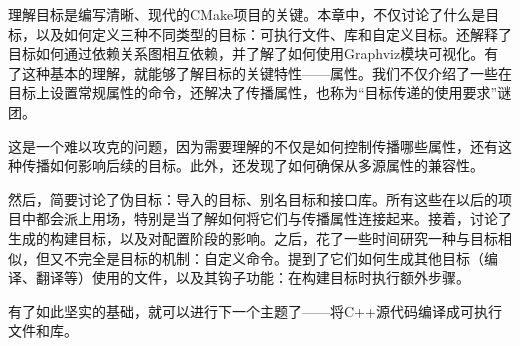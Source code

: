 理解目标是编写清晰、现代的CMake项目的关键。本章中，不仅讨论了什么是目标，以及如何定义三种不同类型的目标：可执行文件、库和自定义目标。还解释了目标如何通过依赖关系图相互依赖，并了解了如何使用Graphviz模块可视化。有了这种基本的理解，就能够了解目标的关键特性——属性。我们不仅介绍了一些在目标上设置常规属性的命令，还解决了传播属性，也称为“目标传递的使用要求”谜团。

这是一个难以攻克的问题，因为需要理解的不仅是如何控制传播哪些属性，还有这种传播如何影响后续的目标。此外，还发现了如何确保从多源属性的兼容性。

然后，简要讨论了伪目标：导入的目标、别名目标和接口库。所有这些在以后的项目中都会派上用场，特别是当了解如何将它们与传播属性连接起来。接着，讨论了生成的构建目标，以及对配置阶段的影响。之后，花了一些时间研究一种与目标相似，但又不完全是目标的机制：自定义命令。提到了它们如何生成其他目标（编译、翻译等）使用的文件，以及其钩子功能：在构建目标时执行额外步骤。

有了如此坚实的基础，就可以进行下一个主题了——将C++源代码编译成可执行文件和库。